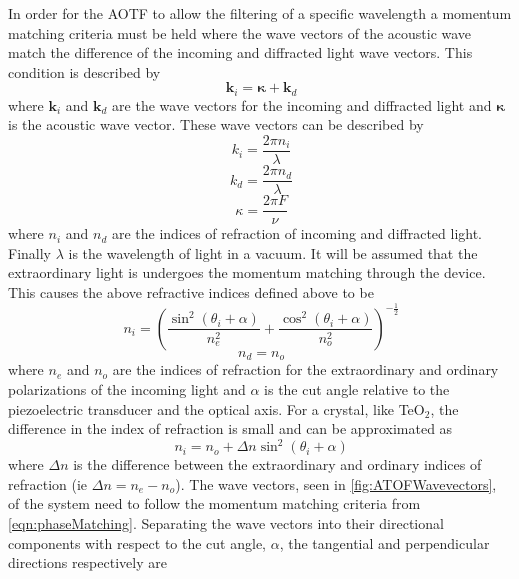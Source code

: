 In order for the AOTF to allow the filtering of a specific wavelength a momentum matching criteria must be held where the wave vectors of the acoustic wave match the difference of the incoming and diffracted light wave vectors. This condition is described by
\begin{equation}
    \ \mathbf{k}_{i} = \boldsymbol\kappa + \mathbf{k}_{d}
    \label{eqn:phaseMatching}
\end{equation}
where $\mathbf{k}_{i}$ and $\mathbf{k}_{d}$ are the wave vectors for the incoming and diffracted light and $\boldsymbol\kappa$ is the acoustic wave vector. These wave vectors can be described by
\begin{equation}
    \ k_{i} = \frac{2\pi n_{i}}{\lambda}
    \label{eqn:incomingWavevector}
\end{equation}
\begin{equation}
    \ k_{d} = \frac{2\pi n_{d}}{\lambda}
    \label{eqn:diffractedWavevector}
\end{equation}
\begin{equation}
    \ \kappa = \frac{2\pi F}{\nu}
    \label{eqn:acousticWavevector}
\end{equation}
where $n_{i}$ and $n_{d}$ are the indices of refraction of incoming and diffracted light. Finally $\lambda$ is the wavelength of light in a vacuum. It will be assumed that the extraordinary light is undergoes the momentum matching through the device. This causes the above refractive indices defined above to be
\begin{equation}
    \ n_{i} = \left( \frac{\sin^{2}(\theta_{i}+\alpha)}{n_{e}^{2}} + \frac{\cos^{2}(\theta_{i}+\alpha)}{n_{o}^{2}} \right)^{-\frac{1}{2}}
    \label{eqn:incomingIndexOfRefraction}
\end{equation}
\begin{equation}
    \ n_{d} = n_{o}
    \label{eqn:diffractedIndexOfRefraction}
\end{equation}
where $n_{e}$ and $n_{o}$ are the indices of refraction for the extraordinary and ordinary polarizations of the incoming light and $\alpha$ is the cut angle relative to the piezoelectric transducer and the optical axis. For a crystal, like TeO$_{2}$, the difference in the index of refraction is small and can be approximated as \citep{Voloshinov2007}
 \begin{equation}
    \ n_{i} = n_{o} + \Delta n\sin^{2}(\theta_{i}+\alpha)
    \label{eqn:incomingIndexOfRefractionApprox}
\end{equation}
where $\Delta n$ is the difference between the extraordinary and ordinary indices of refraction (ie $\Delta n = n_{e} - n_{o}$). The wave vectors, seen in \autoref{fig:ATOFWavevectors}, of the system need to follow the momentum matching criteria from \autoref{eqn:phaseMatching}. Separating the wave vectors into their directional components with respect to the cut angle, $\alpha$, the tangential and perpendicular directions respectively are
